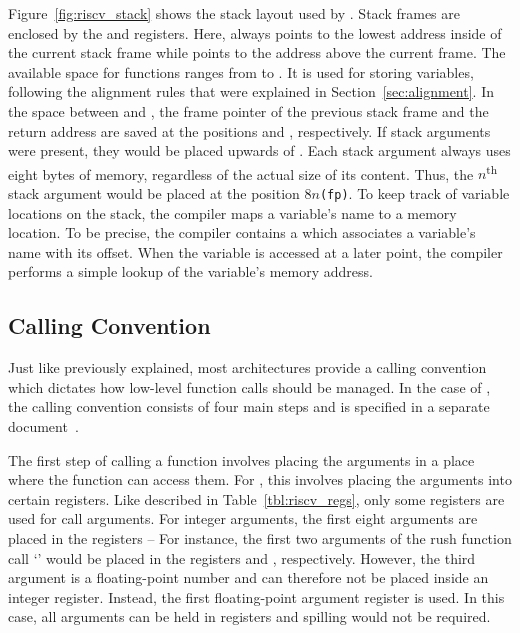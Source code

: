 Figure~\ref{fig:riscv_stack} shows the stack layout used by \riscv{}.
Stack frames are enclosed by the  and  registers.
Here,  always points to the lowest address inside of the current stack frame while
 points to the address above the current frame.
The available space for functions ranges from  to .
It is used for storing variables, following the alignment rules that were explained in Section~\ref{sec:alignment}.
In the space between  and , the frame pointer of the previous stack frame and the return address are saved at the positions \mbox{} and , respectively.
If stack arguments were present, they would be placed upwards of .
Each stack argument always uses eight bytes of memory, regardless of the actual size of its content.
Thus, the $n$\textsuperscript{th} stack argument would be placed at the position $8n$\texttt{(fp)}.
To keep track of variable locations on the stack, the compiler maps a variable's name to a memory location.
To be precise, the compiler contains a  which associates a variable's name with its  offset.
When the variable is accessed at a later point, the compiler performs a simple lookup of the variable's memory address.

\subsection{Calling Convention}\label{sec:riscv_calling_conv}

Just like previously explained, most architectures provide a calling convention which dictates how low-level function calls should be managed.
In the case of \riscv{}, the calling convention consists of four main steps and is specified in a separate document~\cite{RiscvABI2022}.

The first step of calling a function involves placing the arguments in a place where the function can access them.
For \riscv{}, this involves placing the arguments into certain registers.
Like described in Table~\ref{tbl:riscv_regs}, only some registers are used for call arguments.
For integer arguments, the first eight arguments are placed in the registers --
For instance, the first two arguments of the rush function call `' would be placed in the registers  and , respectively.
However, the third argument is a floating-point number and can therefore not be placed inside an integer register.
Instead, the first floating-point argument register  is used.
In this case, all arguments can be held in registers and spilling would not be required.

